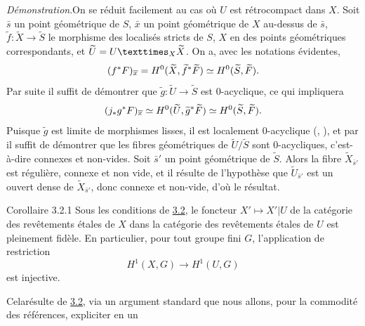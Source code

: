 \documentclass[10pt]{../fichiers-configuration-latex/smfart}
\begin{document}
\noindent
\emph{Démonstration}.\pageoriginale On se réduit facilement au cas où $U$ est
rétrocompact dans $X$. Soit $\bar{s}$ un point géométrique de $S$,
$\bar{x}$ un point géométrique de $X$ au-dessus de $\bar{s}$,
$\widetilde{f}:\widetilde{X}\rightarrow \widetilde{S}$ le morphisme
des localisés stricts de $S$, $X$ en des points géométriques
correspondants, et $\widetilde{U}=\fprod{U}{\widetilde{X}}{X}$. On a,
avec les notations évidentes,
$$
(f^{\ast}F)_{\overline{x}}=H^{0}(\widetilde{X},\widetilde{f}^{\ast}\widetilde{F})\simeq
H^{0}(\widetilde{S},\widetilde{F}){}.
$$
Par suite il suffit de démontrer que
$\widetilde{g}:\widetilde{U}\rightarrow \widetilde{S}$ est
$0$-acyclique, ce qui impliquera
$$
(j_{\ast}g^{\ast}F)_{\overline{x}}\simeq
H^{0}(\widetilde{U},\widetilde{g}^{\ast}\widetilde{F})\simeq
H^{0}(\widetilde{S},\widetilde{F}){}.
$$
Puisque $\widetilde{g}$ est limite de morphismes lisses, il est
localement $0$-acyclique (, ), 
et par  il suffit de
démontrer que les fibres géométriques de $\widetilde{U}/\widetilde{S}$
sont $0$-acycliques, c'est-à-dire connexes et non-vides. Soit
$\bar{s}'$ un point géométrique de $\widetilde{S}$. Alors la fibre
$\widetilde{X}_{\bar{s}'}$ est régulière, connexe et non vide, et il
résulte de l'hypothèse que $\widetilde{U}_{\bar{s}'}$ est un ouvert
dense de $\widetilde{X}_{\bar{s}'}$, donc connexe et non-vide, d'où le
résultat.

\begin{enonce*}{Corollaire 3.2.1}
Sous les conditions de \hyperref[XVI.prop3.2]{3.2}, le foncteur $X'\mapsto X'|U$ de la
catégorie des revêtements étales de $X$ dans la catégorie des
revêtements étales de $U$ est pleinement fidèle. En particulier, pour
tout groupe fini $G$, l'application de restriction
$$
H^{1}(X,G)\longrightarrow H^{1}(U,G)
$$
est injective. 
\end{enonce*}
  
Cela\pageoriginale résulte de \hyperref[XVI.prop3.2]{3.2}, via un argument standard que nous
allons, pour la commodité des références, expliciter en un 
\end{document}
